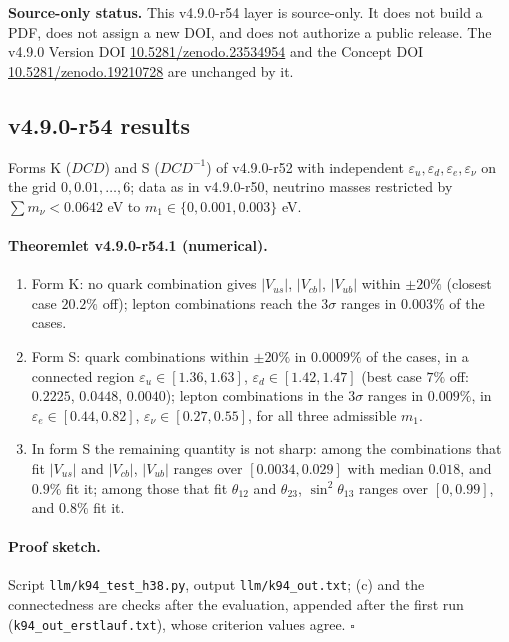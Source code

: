 \noindent\textbf{Source-only status.}
This v4.9.0-r54 layer is source-only.  It does not build a PDF, does not assign a new DOI,
and does not authorize a public release.  The v4.9.0 Version DOI
\href{https://doi.org/10.5281/zenodo.23534954}{10.5281/zenodo.23534954} and the Concept DOI
\href{https://doi.org/10.5281/zenodo.19210728}{10.5281/zenodo.19210728} are unchanged by it.

\subsection*{v4.9.0-r54 results}
\label{subsec:v490-r54-results}

Forms K (\(DCD\)) and S (\(DCD^{-1}\)) of v4.9.0-r52 with independent \(\varepsilon_u,\varepsilon_d,\varepsilon_e,\varepsilon_\nu\) on the grid
\(0,0.01,\dots,6\); data as in v4.9.0-r50, neutrino masses restricted by \(\sum m_\nu<0.0642\) eV to \(m_1\in\{0,0.001,0.003\}\) eV.

\paragraph{Theoremlet v4.9.0-r54.1 (numerical).}
\begin{enumerate}[leftmargin=2em]
\item[(a)] Form K: no quark combination gives \(|V_{us}|\), \(|V_{cb}|\), \(|V_{ub}|\) within \(\pm20\%\) (closest case \(20.2\%\) off); lepton combinations
reach the \(3\sigma\) ranges in \(0.003\%\) of the cases.
\item[(b)] Form S: quark combinations within \(\pm20\%\) in \(0.0009\%\) of the cases, in a connected region \(\varepsilon_u\in[1.36,1.63]\),
\(\varepsilon_d\in[1.42,1.47]\) (best case \(7\%\) off: \(0.2225\), \(0.0448\), \(0.0040\)); lepton combinations in the \(3\sigma\) ranges in \(0.009\%\),
in \(\varepsilon_e\in[0.44,0.82]\), \(\varepsilon_\nu\in[0.27,0.55]\), for all three admissible \(m_1\).
\item[(c)] In form S the remaining quantity is not sharp: among the combinations that fit \(|V_{us}|\) and \(|V_{cb}|\), \(|V_{ub}|\) ranges over
\([0.0034,0.029]\) with median \(0.018\), and \(0.9\%\) fit it; among those that fit \(\theta_{12}\) and \(\theta_{23}\), \(\sin^2\theta_{13}\) ranges over
\([0,0.99]\), and \(0.8\%\) fit it.
\end{enumerate}

\paragraph{Proof sketch.}
Script \texttt{llm/k94\_test\_h38.py}, output \texttt{llm/k94\_out.txt}; (c) and the connectedness are checks after the evaluation, appended after the
first run (\texttt{k94\_out\_erstlauf.txt}), whose criterion values agree.  \(\square\)


